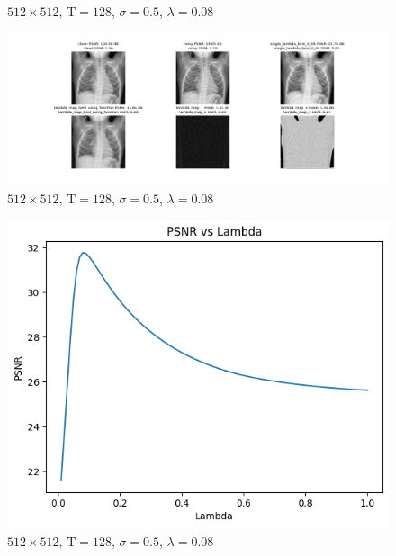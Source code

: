 \documentclass[12pt]{article}
\begin{document}
\begin{figure}[h]
    \caption{$512 \times 512$, $\text{T}=128$, $\sigma=0.5$, $\lambda=0.08$}
    \label{fig:chest_xray}
\end{figure}


\begin{figure}[h]
    \centering
    \includegraphics[width=1\linewidth]{images//chest_xray/results.png}
        
    \caption{$512 \times 512$, $\text{T}=128$, $\sigma=0.5$, $\lambda=0.08$}
    \label{fig:chest_xray}
\end{figure}

\begin{figure}[h]
    \centering
    \includegraphics[width=0.6\linewidth]{images//chest_xray/Lambda vs PSNR.png}
        
    \caption{$512 \times 512$, $\text{T}=128$, $\sigma=0.5$, $\lambda=0.08$}
    \label{fig:chest_xray}
\end{figure}
\end{document}
